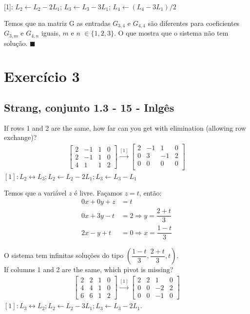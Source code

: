 \documentclass[12pt,a4paper]{article}
\newcommand{\qed}{\hfill $\blacksquare$}
\begin{document}
[1]: $ L_2 \leftarrow L_2 - 2L_1 $; $ L_3 \leftarrow L_3 - 3L_1 $; $ L_4 \leftarrow (L_4 - 3L_1)/2 $

Temos que na matriz G as entradas $ G_{3,4} $ e $ G_{4,4} $ são diferentes para coeficientes $ G_{3,m} $ e $ G_{4,n} $ iguais, $ m $ e $ n $ $ \in \{1,2,3\} $. O que mostra que o sistema não tem solução.
\qed


\newpage
\section*{Exercício 3}
\subsection*{Strang, conjunto 1.3 - 15 - Inlgês}
If rows 1 and 2 are the same, how far can you get with elimination (allowing row exchange)? 
\begin{align*}
\begin{bmatrix}
2 & -1 & 1 & 0\\
2 & -1 & 1 & 0\\
4 & 1  & 1 & 2
\end{bmatrix}
\xrightarrow{[1]}
\begin{bmatrix}
2 & -1 & 1 & 0\\
0 & 3  & -1 & 2\\
0 & 0 & 0 & 0\\
\end{bmatrix}
\end{align*}
$ [1]: L_2 \leftrightarrow L_3; L_2\leftarrow L_2-2L_1; L_3 \leftarrow L_3-L_1$

Temos que a variável $ z $ é livre. Façamos $ z=t $, então:
\begin{align*}
0x +0y + z &= t\\
0x + 3y -t &=2 \Rightarrow y = \dfrac{2+t}{3} \\
2x -y +t &= 0 \Rightarrow x = \dfrac{1-t}{3}
\end{align*}

O sistema tem infinitas soluções do tipo $ (\dfrac{1-t}{3}, \dfrac{2+t}{3}, t ) $.\\


If columns 1 and 2 are the same, which pivot is missing?
\begin{align*}
\begin{bmatrix}
2 & 2 & 1  & 0\\
4 & 4 & 1  & 0\\
6 & 6 & 1  & 2
\end{bmatrix}
\xrightarrow{[1]}
\begin{bmatrix}
2 & 2 & 1  & 0\\
0 & 0 & -2  & 2\\
0 & 0 & -1  & 0
\end{bmatrix}
\end{align*}
$ [1]: L_3 \leftrightarrow L_2; L_2 \leftarrow L_2 - 3L_1; L_3 \leftarrow L_3 - 2L_1 $.
\end{document}
